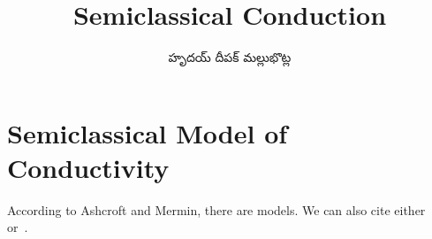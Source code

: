 \documentclass[../main.tex]{subfiles}
\title{Semiclassical Conduction}
\author{\begin{telugu}హృదయ్ దీపక్ మల్లుభొట్ల\end{telugu}}
\date{}
\begin{document}
	\onlyinsubfile{\maketitle}
	\section{Semiclassical Model of Conductivity} \label{sec:SemiclassicalConductivity}

	According to Ashcroft and Mermin, there are models\cite{Ashcroft}.
	We can also cite either~\cite{SolyomV3} or~\cite{SolyomV2}.
\end{document}
